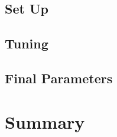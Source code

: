 \documentclass[twoside,11pt]{article}
\begin{document}
\subsection{Set Up}


\subsection{Tuning}

\subsection{Final Parameters}

\section{Summary}


\end{document}
